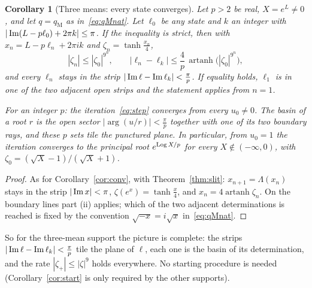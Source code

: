 \documentclass[10pt,a4paper]{article}
\theoremstyle{plain}
\newtheorem{corollary}[theorem]{Corollary}
\theoremstyle{remark}
\numberwithin{equation}{section}
\DeclareMathOperator{\artanh}{artanh}
\begin{document}
\begin{corollary}[Three means: every state converges]\label{cor:all}
Let $p>2$ be real, $X=e^{L}\neq0$, and let $q=q_{\mathrm M}$ as in~\eqref{eq:qMnat}. Let $\ell_0$ be
any state and $k$ an integer with $|\operatorname{Im}(L-p\ell_0)+2\pi k|\le\pi$. If the inequality is strict, then
with $x_n=L-p\ell_n+2\pi ik$ and $\zeta_n=\tanh\frac{x_n}4$,
\[
 |\zeta_n|\le|\zeta_0|^{9^{n}},\qquad
 |\ell_n-\ell_k|\le\frac4p\,\artanh\bigl(|\zeta_0|^{9^{n}}\bigr),
\]
and every $\ell_n$ stays in the strip $|\operatorname{Im}\ell-\operatorname{Im}\ell_k|<\frac\pi p$. If equality holds, $\ell_1$
is in one of the two adjacent open strips and the statement applies from $n=1$.

For an integer $p$: the iteration~\eqref{eq:step} converges from every $u_0\neq0$. The basin of a
root $r$ is the open sector $|\arg(u/r)|<\frac\pi p$ together with one of its two boundary rays,
and these $p$ sets tile the punctured plane. In particular, from $u_0=1$ the iteration converges to
the principal root $e^{\operatorname{Log} X/p}$ for every $X\notin(-\infty,0)$, with
$\zeta_0=(\sqrt X-1)/(\sqrt X+1)$.
\end{corollary}

\begin{proof}
As for Corollary~\ref{cor:conv}, with Theorem~\ref{thm:slit}: $x_{n+1}=\Lambda(x_n)$ stays in the
strip $|\operatorname{Im} x|<\pi$, $\zeta(e^{x})=\tanh\frac x4$, and $x_n=4\artanh\zeta_n$. On the boundary lines
part (ii) applies; which of the two adjacent determinations is reached is fixed by the convention
$\sqrt{-x}=i\sqrt x$ in~\eqref{eq:qMnat}.
\end{proof}

So for the three-mean support the picture is complete: the strips $|\operatorname{Im}\ell-\operatorname{Im}\ell_k|<\frac\pi p$
tile the plane of $\ell$, each one is the basin of its determination, and the rate
$|\zeta_+|\le|\zeta|^{9}$ holds everywhere. No starting procedure is needed
(Corollary~\ref{cor:start} is only required by the other supports).
\end{document}
